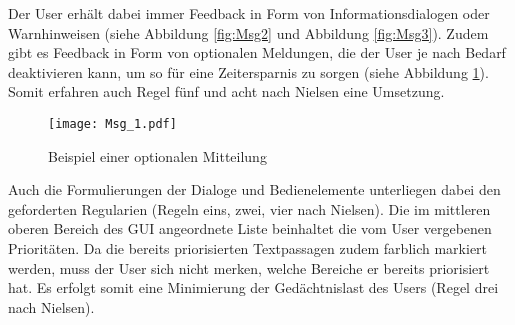Der User erh{\"a}lt dabei immer Feedback in Form von
Informationsdialogen oder Warnhinweisen (siehe Abbildung \ref{fig:Msg2} und
Abbildung
\ref{fig:Msg3}). Zudem gibt es Feedback in Form von optionalen Meldungen, die
der User je nach Bedarf deaktivieren kann, um so f{\"u}r eine Zeitersparnis zu
sorgen (siehe Abbildung \ref{fig:Msg1}). Somit erfahren auch Regel f{\"u}nf und
acht nach Nielsen eine Umsetzung.

\begin{figure}[H]
\centering
\texttt{[image: Msg\_1.pdf]}
\caption{Beispiel einer optionalen Mitteilung}
\label{fig:Msg1}
\end{figure}

Auch die Formulierungen der Dialoge und Bedienelemente unterliegen dabei den
geforderten Regularien (Regeln eins, zwei, vier nach Nielsen). Die im mittleren
oberen Bereich des \gls{GUI} angeordnete Liste beinhaltet die vom User
vergebenen Priorit{\"a}ten. Da die bereits priorisierten Textpassagen zudem farblich
markiert werden, muss der User sich nicht merken, welche Bereiche er bereits
priorisiert hat. Es erfolgt somit eine Minimierung der Ged{\"a}chtnislast des
Users (Regel drei nach Nielsen).
